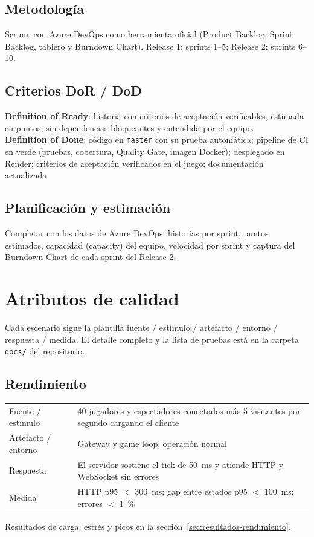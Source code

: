 \documentclass[11pt,a4paper]{article}
\begin{document}
\subsection{Metodología}
Scrum, con Azure DevOps como herramienta oficial (Product Backlog, Sprint
Backlog, tablero y Burndown Chart). Release 1: sprints 1--5; Release 2:
sprints 6--10.

\subsection{Criterios DoR / DoD}
\textbf{Definition of Ready}: historia con criterios de aceptación
verificables, estimada en puntos, sin dependencias bloqueantes y entendida
por el equipo.\\
\textbf{Definition of Done}: código en \texttt{master} con su prueba
automática; pipeline de CI en verde (pruebas, cobertura, Quality Gate,
imagen Docker); desplegado en Render; criterios de aceptación verificados en
el juego; documentación actualizada.

\subsection{Planificación y estimación}
\begin{pendiente}
Completar con los datos de Azure DevOps: historias por sprint, puntos
estimados, capacidad (capacity) del equipo, velocidad por sprint y captura
del Burndown Chart de cada sprint del Release 2.
\end{pendiente}

\section{Atributos de calidad}
Cada escenario sigue la plantilla fuente / estímulo / artefacto / entorno /
respuesta / medida. El detalle completo y la lista de pruebas está en la
carpeta \texttt{docs/} del repositorio.

\subsection{Rendimiento}
\begin{tabularx}{\textwidth}{lL}
\toprule
Fuente / estímulo & 40 jugadores y espectadores conectados más 5 visitantes por segundo cargando el cliente\\
Artefacto / entorno & Gateway y game loop, operación normal\\
Respuesta & El servidor sostiene el tick de 50~ms y atiende HTTP y WebSocket sin errores\\
Medida & HTTP p95 $<$ 300~ms; gap entre estados p95 $<$ 100~ms; errores $<$ 1~\%\\
\bottomrule
\end{tabularx}
Resultados de carga, estrés y picos en la sección~\ref{sec:resultados-rendimiento}.
\end{document}
